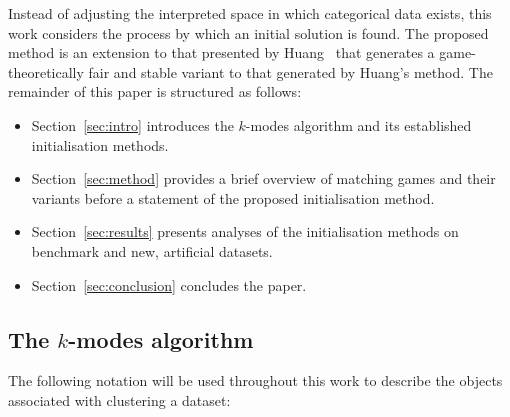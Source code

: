 Instead of adjusting the interpreted space in which categorical data exists,
this work considers the process by which an initial solution is found. The
proposed method is an extension to that presented by Huang~\cite{Huang1998} that
generates a game-theoretically fair and stable variant to that generated by
Huang's method. The remainder of this paper is structured as follows:

\begin{itemize}
    \item Section~\ref{sec:intro} introduces the \(k\)-modes algorithm and its
        established initialisation methods.
    \item Section~\ref{sec:method} provides a brief overview of
        matching games and their variants before a statement of the proposed
        initialisation method.
    \item Section~\ref{sec:results} presents analyses of the initialisation
        methods on benchmark and new, artificial datasets.
    \item Section~\ref{sec:conclusion} concludes the paper.
\end{itemize}


\subsection{The \(k\)-modes algorithm}\label{subsec:kmodes}

The following notation will be used throughout this work to describe the objects
associated with clustering a dataset:

